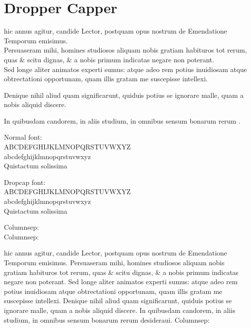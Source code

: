 

\chapter[Dropcap]{Dropper Capper}

\setcounter{parcount}{0}
\begin{parnumbers}
 hic annus agitur, candide Lector, postquam opus nostrum de Emendatione Temporum emisimus.
\\ \p
Persuaseram mihi, homines studiosos aliquam nobis gratiam habituros tot rerum, quas \& scitu dignas, \& a nobis primum indicatas negare non poterant.
\\ \p
Sed longe aliter animatos experti sumus: atque adeo rem potius inuidiosam atque obtrectationi opportunam, quam illis gratam me suscepisse intellexi.

Denique nihil aliud quam significarunt, quiduis potius se ignorare malle, quam a nobis aliquid discere.

In quibusdam candorem, in aliis studium, in omnibus sensum bonarum rerum .

Normal font:\\
ABCDEFGHIJKLMNOPQRSTUVWXYZ\\
abcdefghijklmnopqrstuvwxyz\\
Quistactum solissima

Dropcap font:\\
{\dropcapfont
ABCDEFGHIJKLMNOPQRSTUVWXYZ\\
abcdefghijklmnopqrstuvwxyz\\
Quistactum solissima
}

\end{parnumbers}
Columnsep: \the\columnsep
\setlength{\columnsep}{30pt} \\
Columnsep: \the\columnsep

 hic annus agitur, candide Lector, postquam opus nostrum de Emendatione Temporum emisimus.
Persuaseram mihi, homines studiosos aliquam nobis gratiam habituros tot rerum, quas \& scitu dignas, \& a nobis primum indicatas negare non poterant.
Sed longe aliter animatos experti sumus: atque adeo rem potius inuidiosam atque obtrectationi opportunam, quam illis gratam me suscepisse intellexi.
Denique nihil aliud quam significarunt, quiduis potius se ignorare malle, quam a nobis aliquid discere.
In quibusdam candorem, in aliis studium, in omnibus sensum bonarum rerum desideraui.
Columnsep: \the\columnsep

